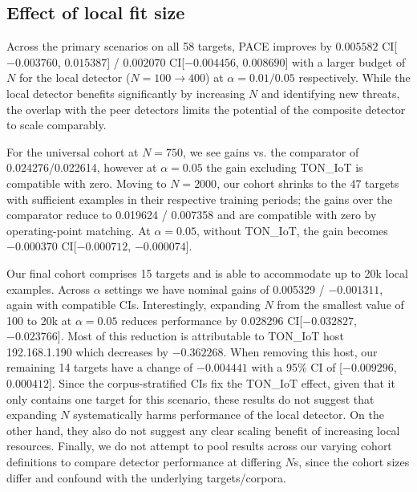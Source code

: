 \subsection{Effect of local fit size} 
Across the primary scenarios on all 58 targets, PACE improves by $0.005582$ CI[$-0.003760$, $0.015387$] / $0.002070$ CI[$-0.004456$, $0.008690$] with a larger budget of $N$ for the local detector ($N=100\to 400$) at $\alpha = 0.01 / 0.05$ respectively. While the local detector benefits significantly by increasing $N$ and identifying new threats, the overlap with the peer detectors limits the potential of the composite detector to scale comparably.

For the universal cohort at $N=750$, we see gains vs.  the comparator of 0.024276/0.022614, however at $\alpha=0.05$ the gain excluding TON\_IoT is compatible with zero. Moving to $N=2000$, our cohort shrinks to the 47 targets with sufficient examples in their respective training periods; the gains over the comparator reduce to 0.019624 / 0.007358 and are compatible with zero by operating-point matching. At $\alpha=0.05$, without TON\_IoT, the gain becomes $-0.000370$ CI[$-0.000712$, $-0.000074$].

Our final cohort comprises 15 targets and is able to accommodate up to 20k local examples. Across $\alpha$ settings we have nominal gains of 0.005329 / $-0.001311$, again with compatible CIs. Interestingly, expanding $N$ from the smallest value of 100 to 20k at $\alpha=0.05$ reduces performance by 0.028296 CI[$-0.032827$, $-0.023766$]. Most of this reduction is attributable to TON\_IoT host 192.168.1.190 which decreases by $-0.362268$. When removing this host, our remaining 14 targets have a change of $-0.004441$ with a 95\% CI of [$-0.009296$, $0.000412$]. Since the corpus-stratified CIs fix the TON\_IoT effect, given that it only contains one target for this scenario, these results do not suggest that expanding $N$ systematically harms performance of the local detector. On the other hand, they also do not suggest any clear scaling benefit of increasing local resources. Finally, we do not attempt to pool results across our varying cohort definitions to compare detector performance at differing $N$s, since the cohort sizes differ and confound with the underlying targets/corpora.

